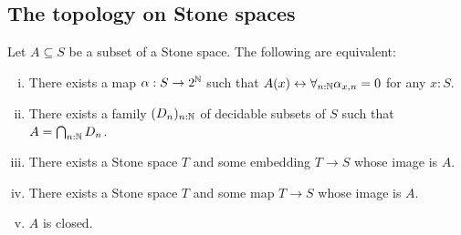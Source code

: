 \subsection{The topology on Stone spaces}
\begin{theorem}\label{StoneClosedSubsets}
  Let $A\subseteq S$ be a subset of a Stone space. The following are equivalent:
  \begin{enumerate}[(i)]
    \item There exists a map $\alpha:S \to 2^{\mathbb{N}}$ such that 
      $A (x) \leftrightarrow \forall_{n:\mathbb{N}} \alpha_{x,n} = 0$ for any $x:S$. 
    \item There exists a family 
      $(D_n)_{n:\mathbb{N}}$ 
      of decidable subsets of $S$ such that $A = \bigcap_{n:\mathbb{N}} D_n$. 
    \item There exists a Stone space $T$ and some embedding $T\to S$ whose image is $A$.
    \item There exists a Stone space $T$ and some map $T\to S$ whose image is $A$. 
    \item $A$ is closed.
  \end{enumerate}
\end{theorem}
